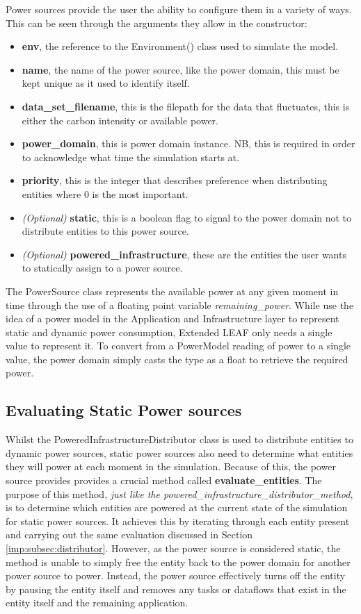 \documentclass{l4proj}
\begin{document}
Power sources provide the user the ability to configure them in a variety of ways.
This can be seen through the arguments they allow in the constructor:
\begin{itemize}
    \item \textbf{env}, the reference to the Environment() class used to simulate the model.
    \item \textbf{name}, the name of the power source, like the power domain, this must be kept unique as it used to identify itself.
    \item \textbf{data\_set\_filename}, this is the filepath for the data that fluctuates, this is either the carbon intensity or available power.
    \item \textbf{power\_domain}, this is power domain instance. NB, this is required in order to acknowledge what time the simulation starts at.
    \item \textbf{priority}, this is the integer that describes preference when distributing entities where 0 is the most important.
    \item \textit{(Optional)} \textbf{static}, this is a boolean flag to signal to the power domain not to distribute entities to this power source.
    \item \textit{(Optional)} \textbf{powered\_infrastructure}, these are the entities the user wants to statically assign to a power source.
\end{itemize}
The PowerSource class represents the available power at any given moment in time through the use of a floating point variable \textit{remaining\_power}.
While \cite{leaf2021} use the idea of a power model in the Application and Infrastructure layer to represent static and dynamic power consumption, Extended LEAF only needs a single value to represent it.
To convert from a PowerModel reading of power to a single value, the power domain simply casts the type as a float to retrieve the required power.

\subsection{Evaluating Static Power sources}\label{imp:subsec:static-entities}
Whilst the PoweredInfrastructureDistributor class is used to distribute entities to dynamic power sources, static power sources also need to determine what entities they will power at each moment in the simulation.
Because of this, the power source provides provides a crucial method called \textbf{evaluate\_entities}.
The purpose of this method, \textit{just like the powered\_infrastructure\_distributor\_method}, is to determine which entities are powered at the current state of the simulation for static power sources.
It achieves this by iterating through each entity present and carrying out the same evaluation discussed in Section \ref{imp:subsec:distributor}.
However, as the power source is considered static, the method is unable to simply free the entity back to the power domain for another power source to power.
Instead, the power source effectively turns off the entity by pausing the entity itself and removes any tasks or dataflows that exist in the entity itself and the remaining application.
\end{document}
